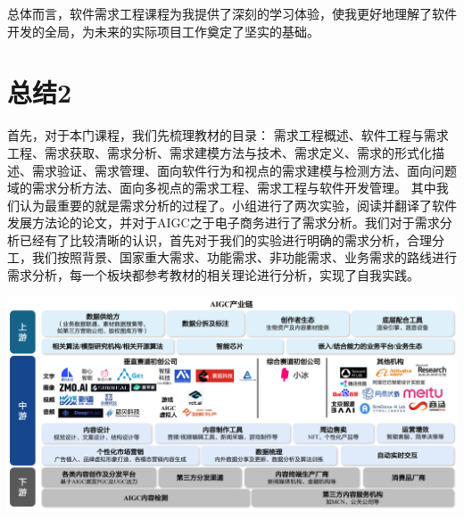 \documentclass[11pt, a4paper, oneside]{ctexbook}
\begin{document}
总体而言，软件需求工程课程为我提供了深刻的学习体验，使我更好地理解了软件开发的全局，为未来的实际项目工作奠定了坚实的基础。

\section{总结2}
首先，对于本门课程，我们先梳理教材的目录：
需求工程概述、软件工程与需求工程、需求获取、需求分析、需求建模方法与技术、需求定义、需求的形式化描述、需求验证、需求管理、面向软件行为和视点的需求建模与检测方法、面向问题域的需求分析方法、面向多视点的需求工程、需求工程与软件开发管理。
其中我们认为最重要的就是需求分析的过程了。小组进行了两次实验，阅读并翻译了软件发展方法论的论文，并对于AIGC之于电子商务进行了需求分析。我们对于需求分析已经有了比较清晰的认识，首先对于我们的实验进行明确的需求分析，合理分工，我们按照背景、国家重大需求、功能需求、非功能需求、业务需求的路线进行需求分析，每一个板块都参考教材的相关理论进行分析，实现了自我实践。
 
\begin{center}
  \begin{minipage}{\textwidth}
    \center
    \includegraphics[width=\textwidth]{5.png}
    \captionsetup{hypcap=false}
    \label{fig:5}
  \end{minipage}
\end{center}
\end{document}
